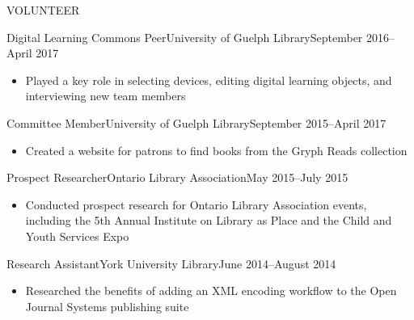 \documentclass[]{mcdowellcv}
\begin{document}
  \begin{cvsection}{VOLUNTEER}
    \begin{cvsubsection}{Digital Learning Commons Peer}{University of Guelph Library}{September 2016--April 2017}
   \begin{itemize}
     \item Played a key role in selecting devices, editing digital learning objects, and interviewing new team members
   \end{itemize}
 \end{cvsubsection}

     \begin{cvsubsection}{Committee Member}{University of Guelph Library}{September 2015--April 2017}
   \begin{itemize}
     \item Created a website for patrons to find books from the Gryph Reads collection
   \end{itemize}
 \end{cvsubsection}

    \begin{cvsubsection}{Prospect Researcher}{Ontario Library Association}{May 2015--July 2015}
   \begin{itemize}
     \item Conducted prospect research for Ontario Library Association events, including the 5th Annual Institute on Library as Place and the Child and Youth Services Expo
   \end{itemize}
 \end{cvsubsection}

     \begin{cvsubsection}{Research Assistant}{York University Library}{June 2014--August 2014}
   \begin{itemize}
     \item Researched the benefits of adding an XML encoding workflow to the Open Journal Systems publishing suite
   \end{itemize}
 \end{cvsubsection}
\end{cvsection}
\end{document}
